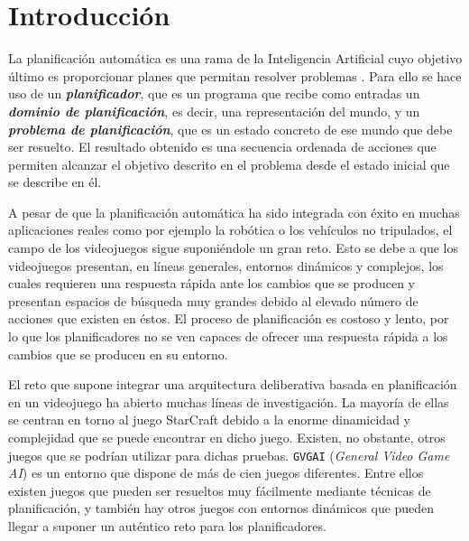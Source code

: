 
\chapter{Introducción}

La planificación automática es una rama de la Inteligencia Artificial cuyo objetivo
último es proporcionar planes que permitan resolver problemas \cite{10.5555/3073924}.
Para ello se hace uso de un \textbf{\textit{planificador}}, que es un programa que recibe
como entradas un \textbf{\textit{dominio de planificación}}, es decir, una representación
del mundo, y un \textbf{\textit{problema de planificación}}, que es un estado concreto de
ese mundo que debe ser resuelto. El resultado obtenido es una secuencia ordenada de acciones
que permiten alcanzar el objetivo descrito en el problema desde el estado
inicial que se describe en él.

A pesar de que la planificación automática ha sido integrada con éxito en muchas aplicaciones
reales como por ejemplo la robótica o los vehículos no tripulados, el campo de los videojuegos
sigue suponiéndole un gran reto. Esto se debe a que los videojuegos presentan, en líneas generales,
entornos dinámicos y complejos, los cuales requieren una respuesta rápida ante los cambios que se producen
y presentan espacios de búsqueda muy grandes debido al elevado número de acciones que existen en éstos.
El proceso de planificación es costoso y lento, por lo que los planificadores no se ven
capaces de ofrecer una respuesta rápida a los cambios que se producen en su entorno.

El reto que supone integrar una arquitectura deliberativa basada en planificación en un videojuego ha
abierto muchas líneas de investigación. La mayoría de ellas se centran en torno al juego
StarCraft \cite{10.1007/978-3-540-74141-1_12, Churchill2011BuildOO, Weber2011BuildingHA, Aha_2018}
debido a la enorme dinamicidad y complejidad que se puede encontrar en dicho juego.
Existen, no obstante, otros juegos que se podrían utilizar para dichas pruebas.
\texttt{GVGAI} (\textit{General Video Game AI})\cite{7038214} es un entorno que
dispone de más de cien juegos diferentes. Entre ellos existen juegos que pueden ser resueltos
muy fácilmente mediante técnicas de planificación, y también hay otros juegos con entornos
dinámicos que pueden llegar a suponer un auténtico reto para los planificadores.

